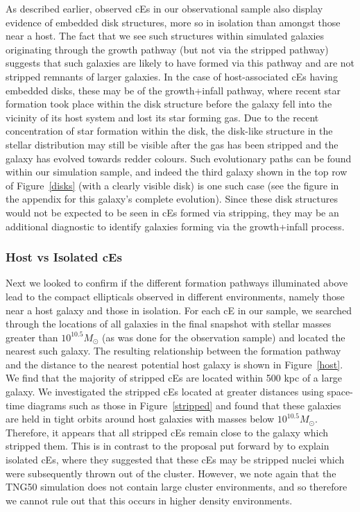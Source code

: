 \documentclass[a4paper,fleqn,usenatbib]{mnras}
\begin{document}
As described earlier, observed cEs in our observational sample also display evidence of embedded disk structures, more so in isolation than amongst those near a host. The fact that we see such structures within simulated galaxies originating through the growth pathway (but not via the stripped pathway) suggests that such galaxies are likely to have formed via this pathway and are not stripped remnants of larger galaxies. In the case of host-associated cEs having embedded disks, these may be of the growth+infall pathway, where recent star formation took place within the disk structure before the galaxy fell into the vicinity of its host system and lost its star forming gas. Due to the recent concentration of star formation within the disk, the disk-like structure in the stellar distribution may still be visible after the gas has been stripped and the galaxy has evolved towards redder colours. Such evolutionary paths can be found within our simulation sample, and indeed the third galaxy shown in the top row of Figure~\ref{disks} (with a clearly visible disk) is one such case (see the figure in the appendix for this galaxy's complete evolution). Since these disk structures would not be expected to be seen in cEs formed via stripping, they may be an additional diagnostic to identify galaxies forming via the growth+infall process. 




\subsubsection{Host vs Isolated cEs}

Next we looked to confirm if the different formation pathways illuminated above lead to the compact ellipticals observed in different environments, namely those near a host galaxy and those in isolation. For each cE in our sample, we searched through the locations of all galaxies in the final snapshot with stellar masses greater than $10^{10.5}M_{\odot}$ (as was done for the observation sample) and located the nearest such galaxy. The resulting relationship between the formation pathway and the distance to the nearest potential host galaxy is shown in Figure~\ref{host}. We find that the majority of stripped cEs are located within 500 kpc of a large galaxy. We investigated the stripped cEs located at greater distances using space-time diagrams such as those in Figure~\ref{stripped} and found that these galaxies are held in tight orbits around host galaxies with masses below $10^{10.5}M_{\odot}$. Therefore, it appears that all stripped cEs remain close to the galaxy which stripped them. This is in contrast to the proposal put forward by \citet{2015Sci...348..418C} to explain isolated cEs, where they suggested that these cEs may be stripped nuclei which were subsequently thrown out of the cluster. However, we note again that the TNG50 simulation does not contain large cluster environments, and so therefore we cannot rule out that this occurs in higher density environments. 
\end{document}
